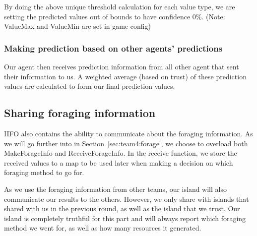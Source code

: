 By doing the above unique threshold calculation for each value type, we are setting the predicted values out of bounds to have confidence 0\%. (Note: ValueMax and ValueMin are set in game config)

\subsubsection{Making prediction based on other agents' predictions}
Our agent then receives prediction information from all other agent that sent their information to us. A weighted average (based on trust) of these prediction values are calculated to form our final prediction values.



\subsection{Sharing foraging information} \label{sec:team4:IIFO:forage}
IIFO also contains the ability to communicate about the foraging information. As we will go further into in Section~\ref{sec:team4:forage},
we choose to overload both MakeForageInfo and ReceiveForageInfo. In the receive function, we store the received values to a map to be used later when making a decision on which foraging method to go for. 

As we use the foraging information from other teams, our island will also communicate our results to the others. However, we only share with islands that shared with us in the previous round, as well as the island that we trust. Our island is completely truthful for this part and will always report which foraging method we went for, as well as how many resources it generated.

